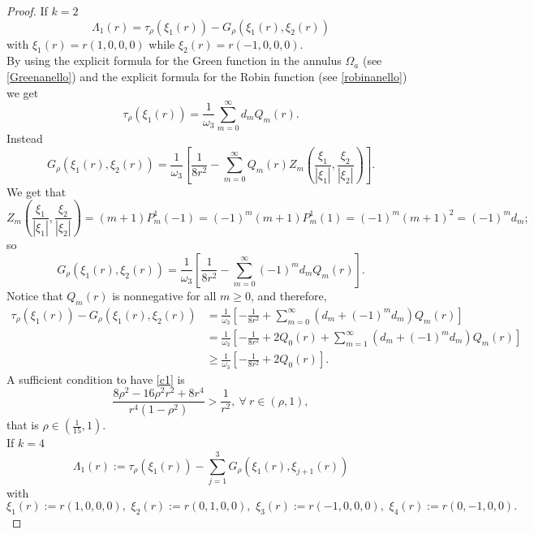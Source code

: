 \documentclass[11pt,a4paper]{amsart}
\theoremstyle{definition}
\renewcommand{\(}{\left(}
\renewcommand{\)}{\right)}
\begin{document}
\begin{proof}
If $k=2$
$$\Lambda_1(r)=\tau_\rho(\xi_1(r))-G_\rho(\xi_1(r), \xi_{2}(r))$$  with
 $\xi_1(r)=r(1, 0, 0, 0)$ while $\xi_2(r)=r(-1, 0, 0, 0)$.\\ 
By using the explicit formula for the Green function in the annulus $\Omega_{a}$ (see \eqref{Greenanello}) and the explicit formula for the Robin function (see \eqref{robinanello}) we get
\begin{equation*}
\tau_\rho(\xi_1(r)) = \frac{1}{\omega_3} \sum_{m=0}^{\infty} d_{m} Q_{m}(r).
\end{equation*}
Instead
\begin{equation*}
G_\rho(\xi_1(r),\xi_2(r)) = \frac{1}{\omega_3} \left[ \frac{1}{8r^{2}} - \sum_{m=0}^{\infty} Q_{m}(r) Z_{m}\left(\frac{\xi_1}{|\xi_1|}, \frac{\xi_2}{|\xi_2|}\right) \right].
\end{equation*}
We get that
\begin{equation*}
Z_{m}\left(\frac{\xi_1}{|\xi_1|}, \frac{\xi_2}{|\xi_2|}\right) = (m+1)P_{m}^{1}(-1)=(-1)^{m}(m+1)P_{m}^{1}(1)=(-1)^{m}(m+1)^{2}=(-1)^m d_m;
\end{equation*}
so
\begin{equation*}
G_\rho(\xi_1(r),\xi_2(r)) = \frac{1}{\omega_3} \left[ \frac{1}{8r^{2}} - \sum_{m=0}^{\infty} (-1)^{m} d_m Q_{m}(r) \right].
\end{equation*}
Notice that $Q_{m}(r)$ is nonnegative for all $m \geq 0$, and therefore,
\begin{equation*}
\begin{aligned}
\tau_\rho(\xi_1(r))-G_\rho(\xi_1(r),\xi_2(r)) & = \frac{1}{\omega_3} \left[ -\frac{1}{8r^{2}} + \sum_{m=0}^{\infty} (d_m+ (-1)^{m} d_m) Q_{m}(r) \right]
\\& = \frac{1}{\omega_3} \left[ -\frac{1}{8r^{2}} + 2Q_{0}(r) + \sum_{m=1}^{\infty} (d_m+ (-1)^{m} d_m) Q_{m}(r) \right]
\\& \geq \frac{1}{\omega_3} \left[ - \frac{1}{8r^{2}} + 2Q_{0}(r) \right].\end{aligned}
\end{equation*}
A sufficient condition to have \eqref{c1} is 
\begin{equation*}
\frac{8\rho^2 -16\rho^2r^2+8r^4}{r^{4}(1-\rho^2)} > \frac{1}{r^2}, \   \forall\ r \in (\rho,1),
\end{equation*}
that is $\rho \in (\frac{1}{15}, 1)$.\\ 
If $k=4$
$$\Lambda_1(r):=\tau_\rho(\xi_1(r))-\sum_{j=1}^3 G_\rho(\xi_1(r), \xi_{j+1}(r))$$ with $$\xi_1(r):=r(1, 0, 0, 0),\,\, \xi_2(r):=r(0, 1, 0, 0), \,\, \xi_3(r):=r(-1, 0, 0, 0),\,\, \xi_4(r):=r (0, -1, 0, 0).$$ 

\end{proof}
\end{document}
